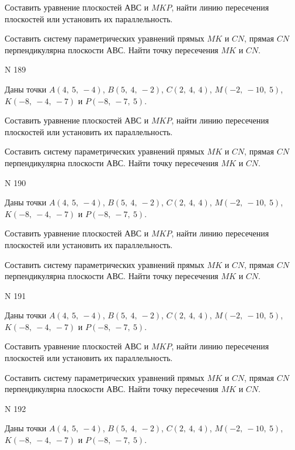 \documentclass[11pt]{report}
\begin{document}
Составить уравнение плоскостей $АВС$ и $MKP$,
найти линию пересечения плоскостей или установить их параллельность.

Составить систему параметрических уравнений прямых $MK$ и $CN$,
прямая $CN$ перпендикулярна плоскости $АВС$. 
Найти точку пересечения $MK$ и $CN$.



 N 189

Даны точки $A\left( 4, \  5, \  -4\right)$, $B\left( 5, \  4, \  -2\right)$, $C\left( 2, \  4, \  4\right)$, $M\left( -2, \  -10, \  5\right)$, $K\left( -8, \  -4, \  -7\right)$ и $P\left( -8, \  -7, \  5\right)$.


Составить уравнение плоскостей $АВС$ и $MKP$,
найти линию пересечения плоскостей или установить их параллельность.

Составить систему параметрических уравнений прямых $MK$ и $CN$,
прямая $CN$ перпендикулярна плоскости $АВС$. 
Найти точку пересечения $MK$ и $CN$.



 N 190

Даны точки $A\left( 4, \  5, \  -4\right)$, $B\left( 5, \  4, \  -2\right)$, $C\left( 2, \  4, \  4\right)$, $M\left( -2, \  -10, \  5\right)$, $K\left( -8, \  -4, \  -7\right)$ и $P\left( -8, \  -7, \  5\right)$.


Составить уравнение плоскостей $АВС$ и $MKP$,
найти линию пересечения плоскостей или установить их параллельность.

Составить систему параметрических уравнений прямых $MK$ и $CN$,
прямая $CN$ перпендикулярна плоскости $АВС$. 
Найти точку пересечения $MK$ и $CN$.



 N 191

Даны точки $A\left( 4, \  5, \  -4\right)$, $B\left( 5, \  4, \  -2\right)$, $C\left( 2, \  4, \  4\right)$, $M\left( -2, \  -10, \  5\right)$, $K\left( -8, \  -4, \  -7\right)$ и $P\left( -8, \  -7, \  5\right)$.


Составить уравнение плоскостей $АВС$ и $MKP$,
найти линию пересечения плоскостей или установить их параллельность.

Составить систему параметрических уравнений прямых $MK$ и $CN$,
прямая $CN$ перпендикулярна плоскости $АВС$. 
Найти точку пересечения $MK$ и $CN$.



 N 192

Даны точки $A\left( 4, \  5, \  -4\right)$, $B\left( 5, \  4, \  -2\right)$, $C\left( 2, \  4, \  4\right)$, $M\left( -2, \  -10, \  5\right)$, $K\left( -8, \  -4, \  -7\right)$ и $P\left( -8, \  -7, \  5\right)$.
\end{document}
